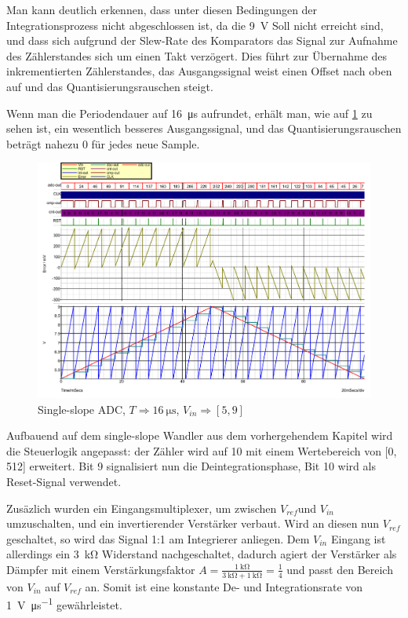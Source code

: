 \documentclass[
	ngerman,
	parskip=half,
	twocolumn,
	DIV=calc,
	]{scrartcl}
\begin{document}
		Man kann deutlich erkennen, dass unter diesen Bedingungen der Integrationsprozess nicht abgeschlossen ist, da die \SI{9}{\volt} Soll nicht erreicht sind, und dass sich aufgrund der Slew-Rate des Komparators das Signal zur Aufnahme des Zählerstandes sich um einen Takt verzögert. Dies führt zur Übernahme des inkrementierten Zählerstandes, das Ausgangssignal weist einen Offset nach oben auf und das Quantisierungsrauschen steigt.
		
		Wenn man die Periodendauer auf \SI{16}{\micro\second} aufrundet, erhält man, wie auf \cref{fig:single-slope-ideal} zu sehen ist, ein wesentlich besseres Ausgangssignal, und das Quantisierungsrauschen beträgt nahezu 0 für jedes neue Sample. 
		
		\begin{figure}[h!]
			\centering
			\includegraphics[width=\linewidth]{ideal_single_slope}
			\caption[Single-slope ADC (T = \SI{16}{\micro\second})]{Single-slope ADC, $T \Rightarrow \SI{16}{\micro\second}$, $V_{in} \Rightarrow [5,  9]$}
			\label{fig:single-slope-ideal}
		\end{figure}
		
		
		\label{sec:dual-slope-adc}
		
		Aufbauend auf dem single-slope Wandler aus dem vorhergehendem Kapitel wird die Steuerlogik angepasst: der Zähler wird auf \SI{10}{\bit} mit einem Wertebereich von [0, 512] erweitert. Bit 9 signalisiert nun die Deintegrationsphase, Bit 10 wird als Reset-Signal verwendet.
				
		Zusäzlich wurden ein Eingangsmultiplexer, um zwischen $V_{ref} $und $V_{in} $ umzuschalten, und ein invertierender Verstärker verbaut.
		Wird an diesen nun $V_{ref} $ geschaltet, so wird das Signal 1:1 am Integrierer anliegen. Dem $V_{in}$ Eingang ist allerdings ein \SI{3}{\kilo\ohm} Widerstand nachgeschaltet, dadurch agiert der Verstärker als Dämpfer mit einem Verstärkungsfaktor $ A = \frac{\SI{1}{\kilo\ohm}}{\SI{3}{\kilo\ohm} + \SI{1}{\kilo\ohm}} = \frac{1}{4}$ und passt den Bereich von $V_{in} $ auf $V_{ref} $ an. Somit ist eine konstante De- und Integrationsrate von \SI{1}{\volt\per\micro\second} gewährleistet.
		
\end{document}
